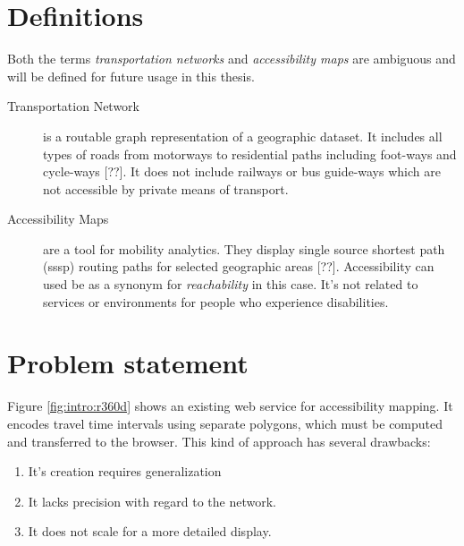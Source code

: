   \section{Definitions}
    \label{sec:intro:def}

    Both the terms \textit{transportation networks} and \textit{accessibility
    maps} are ambiguous and will be defined for future usage in this
    thesis.\par

    \begin{description}
      \item[Transportation Network] is a routable graph representation of a
        geographic dataset.
        It includes all types of roads from motorways to residential paths
        including foot-ways and cycle-ways [??]. It does not include railways or
        bus guide-ways which are not accessible by private means of transport.
      \item[Accessibility Maps] are a tool for mobility analytics. They display
        single source shortest path (\acrshort{sssp}) routing paths for selected
        geographic areas [??]. Accessibility can used be as a synonym for
        \textit{reachability} in this case. It's not related to services or
        environments for people who experience disabilities.
    \end{description}

  \section{Problem statement}
    \label{sec:intro:probl}

    Figure \ref{fig:intro:r360d} shows an existing web service for accessibility
    mapping. It encodes travel time intervals using separate polygons, which
    must be computed and transferred to the browser. This kind of approach has
    several drawbacks:\par

    \begin{enumerate}[\label=({D}1)]
      \item It's creation requires generalization
      \item It lacks precision with regard to the network.
      \item It does not scale for a more detailed display.
    \end{enumerate}

